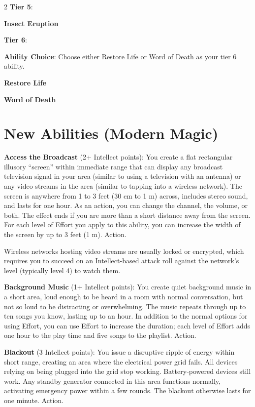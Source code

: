 \begin{multicols}{2}
\textbf{Tier 5}:

\textbf{Insect Eruption}

\textbf{Tier 6}: 

\textbf{Ability Choice}: Choose either Restore Life or Word of Death as your tier 6 ability. 

\textbf{Restore Life} 

\textbf{Word of Death}

\section{New Abilities (Modern Magic)}

\textbf{Access the Broadcast }(2+ Intellect points): You create a flat rectangular illusory “screen” within immediate range that can display any broadcast television signal in your area (similar to using a television with an antenna) or any video streams in the area (similar to tapping into a wireless network). The screen is anywhere from 1 to 3 feet (30 cm to 1 m) across, includes stereo sound, and lasts for one hour. As an action, you can change the channel, the volume, or both. The effect ends if you are more than a short distance away from the screen. For each level of Effort you apply to this ability, you can increase the width of the screen by up to 3 feet (1 m). Action.

Wireless networks hosting video streams are usually locked or encrypted, which requires you to succeed on an Intellect-based attack roll against the network’s level (typically level 4) to watch them.

\textbf{Background Music} (1+ Intellect points): You create quiet background music in a short area, loud enough to be heard in a room with normal conversation, but not so loud to be distracting or overwhelming. The music repeats through up to ten songs you know, lasting up to an hour. In addition to the normal options for using Effort, you can use Effort to increase the duration; each level of Effort adds one hour to the play time and five songs to the playlist. Action.

\textbf{Blackout} (3 Intellect points): You issue a disruptive ripple of energy within short range, creating an area where the electrical power grid fails. All devices relying on being plugged into the grid stop working. Battery‑powered devices still work. Any standby generator connected in this area functions normally, activating emergency power within a few rounds. The blackout otherwise lasts for one minute. Action.


\end{multicols}
